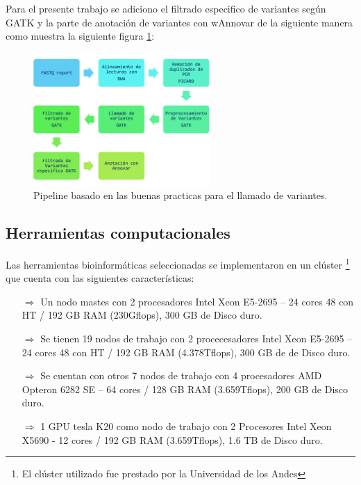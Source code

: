 {Para el presente trabajo se adiciono el filtrado especifico de variantes según GATK y la parte de anotación de variantes con wAnnovar de la siguiente manera como muestra la siguiente figura \ref{fig:pipeline2}:

\begin{figure}[H] 
	\centering
	\includegraphics[width=0.6\textwidth]{Kap2/pipeline1}
	\caption{Pipeline basado en las buenas practicas para el llamado de variantes.} \label{fig:pipeline2}
\end{figure}
	
	\subsection*{Herramientas computacionales}
	
	Las herramientas bioinformáticas seleccionadas se implementaron en un clúster \footnote{El clúster utilizado fue prestado por la Universidad de los Andes} que cuenta con las siguientes características:
	
	\begin{itemize}
		\item[$\Rightarrow$] Un nodo mastes con 2 procesadores Intel Xeon E5-2695 – 24 cores 48 con HT / 192 GB RAM (230Gflops), 300 GB de Disco duro.
		\item[$\Rightarrow$] Se tienen 19 nodos de trabajo con 2 procecesadores  Intel Xeon E5-2695 – 24 cores 48 con HT / 192 GB RAM (4.378Tflops), 300 GB de de Disco duro.
		\item[$\Rightarrow$] Se cuentan con otros 7 nodos de trabajo con 4 procesadores AMD Opteron 6282 SE – 64 cores / 128 GB RAM (3.659Tflops), 200 GB de Disco duro.
		
		\item[$\Rightarrow$] 1 GPU tesla K20 como nodo de trabajo con 2 Procesores  Intel Xeon X5690 - 12 cores / 192 GB RAM (3.659Tflops), 1.6 TB de Disco duro.
		
	\end{itemize}
	
}
